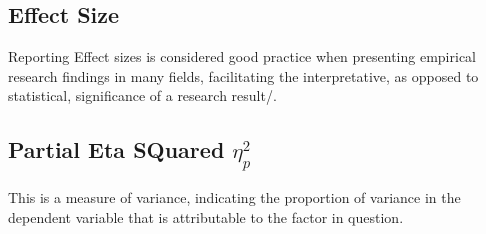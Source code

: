 \subsection{Effect Size}

Reporting Effect sizes is considered good practice when presenting empirical research findings in many fields, facilitating the interpretative, as
opposed to statistical, significance of a research result/.

\subsection{Partial Eta SQuared $\eta^2_p$}
This is a measure of variance, indicating the proportion of variance in the dependent variable that is attributable to the factor in question.

